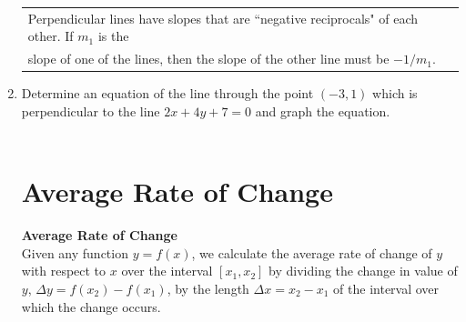 \documentclass[11pt]{article}
\begin{document}
\begin{enumerate}
\hspace{-.3in}\begin{tabular}{| l |  }
\hline Perpendicular lines have slopes that are ``negative reciprocals" of each other. If $m_1$ is the \\ slope of one of the lines, then the slope of the other line must be $-1/m_1$. \\ \hline
\end{tabular} 

\item Determine an equation of the line through the point $(-3, 1)$ which is perpendicular to the line $2x+4y+7=0$ and graph the equation.\\
\\


\section{Average Rate of Change}
\textbf{Average Rate of Change}\\
Given any function $y=f(x)$, we calculate the average rate of change of $y$ with respect to $x$ over the interval  $[x_1,x_2]$ by dividing the change in value of $y$, $\Delta y=f(x_2)-f(x_1)$, by the length  $\Delta x=x_2-x_1$ of the interval over which the change occurs.\\



\end{enumerate}
\end{document}
